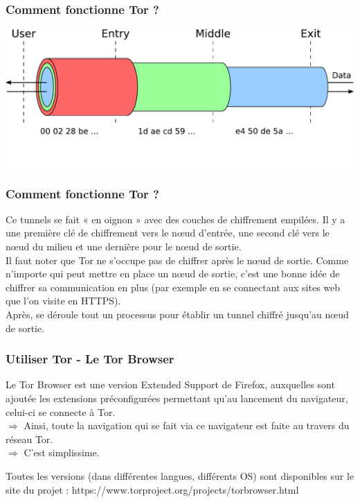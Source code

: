 \documentclass{beamer}
\begin{document}
\begin{frame}
\frametitle{Comment fonctionne Tor ?}
\begin{center}
\includegraphics[keepaspectratio,width=\textwidth, height=.8\textheight]{images/tor-keys1}
\end{center}
\end{frame}

\begin{frame}
\frametitle{Comment fonctionne Tor ?}

Ce tunnels se fait « en oignon » avec des couches de chiffrement empilées. Il y a une première
clé de chiffrement vers le nœud d'entrée, une second clé vers le nœud du milieu et
une dernière pour le nœud de sortie.
\\
Il faut noter que Tor ne s'occupe pas de chiffrer après le nœud de sortie. Comme n'importe
qui peut mettre en place un nœud de sortie, c'est une bonne idée de chiffrer sa communication
en plus (par exemple en se connectant aux sites web que l'on visite en HTTPS).
\\
Après, se déroule tout un processus pour établir un tunnel chiffré jusqu'au
nœud de sortie.
\end{frame}

\begin{frame}
\frametitle{Utiliser Tor - Le Tor Browser}

Le Tor Browser est une version Extended Support de Firefox, auxquelles sont ajoutée les extensions préconfigurées permettant qu’au lancement du navigateur, celui-ci se connecte à Tor. 
\\$\Rightarrow$  Ainsi, toute la navigation qui se fait via ce navigateur est faite au travers du réseau Tor. 
\\$\Rightarrow$ C’est simplissime.

Toutes les versions (dans différentes langues, différents OS) sont disponibles sur le site du projet : https://www.torproject.org/projects/torbrowser.html
\end{frame}
\end{document}
